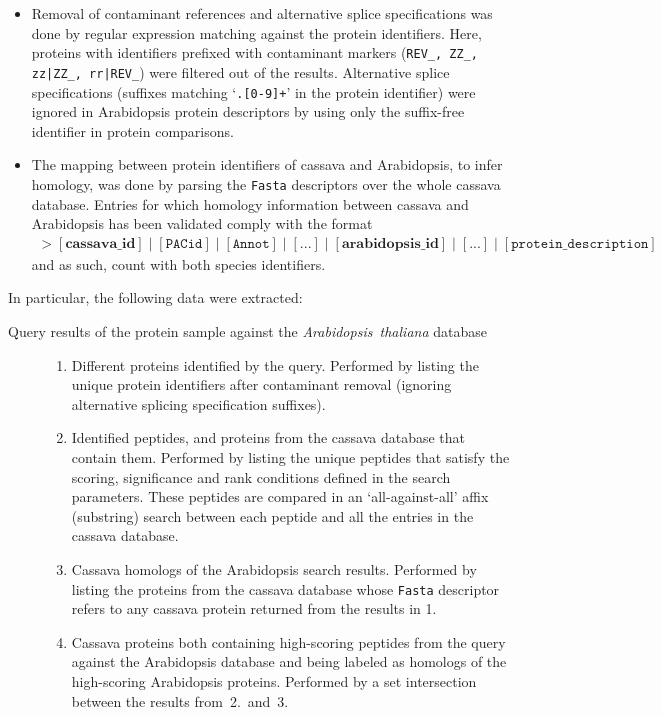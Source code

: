 \documentclass[oneside, a4paper, final]{memoir} %
\begin{document}
\begin{description}
\begin{itemize}
			\item Removal of contaminant references and alternative splice specif{}ications was done by regular expression matching against the protein identif{}iers.
			Here, proteins with identif{}iers pref{}ixed with contaminant markers (\texttt{REV\_, ZZ\_, zz|ZZ\_, rr|REV\_}) were f{}iltered out of the results.
			Alternative splice specif{}ications (suf{}f{}ixes matching `\texttt{.[0-9]+}' in the protein identif{}ier) were ignored in Arabidopsis protein descriptors
			by using only the suf{}f{}ix-free identif{}ier in protein comparisons.

			\item The mapping between protein identif{}iers of cassava and Arabidopsis, to infer homology, was done by parsing
			the \texttt{Fasta} descriptors over the whole cassava database. Entries for which homology information between cassava and Arabidopsis
			has been validated comply with the format
			\begin{align*}
				\mathtt{>[\mathbf{cassava\_id}] \mid [PACid] \mid [Annot] \mid [...] \mid [\mathbf{arabidopsis\_id}] \mid [...] \mid [protein\_description]}
			\end{align*}
			and as such, count with both species identif{}iers.
		\end{itemize}
		
		In particular, the following data were extracted:
		\begin{description}
			\item[Query results of the protein sample against the \emph{Arabidopsis~thaliana} database]\hfill
				\begin{enumerate}
					\item Dif{}ferent proteins identif{}ied by the query.
					Performed by listing the unique protein identif{}iers after contaminant removal (ignoring alternative splicing specif{}ication suf{}f{}ixes).
					\item Identif{}ied peptides, and proteins from the cassava database that contain them.
					Performed by listing the unique peptides that satisfy the scoring, signif{}icance and rank conditions def{}ined in the search parameters.
					These peptides are compared in an `all-against-all' af{}f{}ix (substring) search between each peptide and all the entries in the cassava database.
					\item Cassava homologs of the Arabidopsis search results. Performed by listing the proteins from the cassava database whose \texttt{Fasta} descriptor
					refers to any cassava protein returned from the results in 1.
					\item Cassava proteins both containing high-scoring peptides from the query against the Arabidopsis database and being 
					labeled as homologs of the high-scoring Arabidopsis proteins. Performed by a set intersection between the results from~2.~and~3.
				\end{enumerate}


\end{description}
\end{description}
\end{document}
